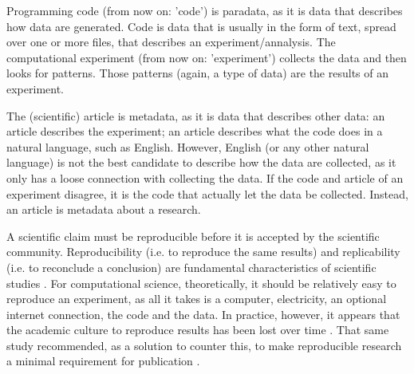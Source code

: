 
Programming code (from now on: 'code') is paradata, 
as it is data that describes how data are generated.
Code is data that is usually in the form of text, 
spread over one or more files, that describes an experiment/annalysis.
The computational experiment (from now on: 'experiment') collects the data
and then looks for patterns.
Those patterns (again, a type of data) are the results of an experiment.

The (scientific) article is metadata, as it is data that describes other data:
an article describes the
experiment; an article describes what the code does in a natural 
language, such as English.
However, English (or any other natural language) is not the best
candidate to describe how the data are collected,
as it only has a loose connection with collecting the data.
If the code and article of an experiment disagree,
it is the code that actually let the data be collected.  
Instead, an article is metadata about a research.


A scientific claim must be reproducible before it is accepted
by the scientific community.
Reproducibility (i.e. to reproduce the same results) 
and replicability (i.e. to reconclude a conclusion)
are fundamental characteristics of scientific studies \cite{patil2019visual}.
For computational science, theoretically, it should be relatively easy to 
reproduce an experiment, as all it takes is a computer, electricity,
an optional internet connection, the code and the data.
In practice, however, it appears that 
the academic culture to reproduce results 
has been lost over time \cite{peng2011reproducible}.
That same study recommended, as a solution to counter this, 
to make reproducible research a minimal requirement for 
publication \cite{peng2011reproducible}.

